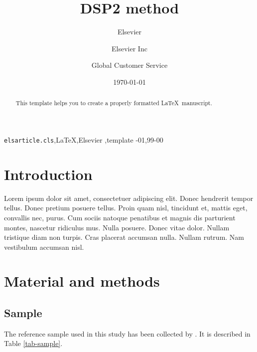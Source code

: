 \documentclass{elsarticle}
\date{\today}
\title{}
\begin{document}
\begin{frontmatter}

\title{DSP2 method}

\author{Elsevier}
\address{Radarweg 29, Amsterdam}

\author[mymainaddress,mysecondaryaddress]{Elsevier Inc}

\author[mysecondaryaddress]{Global Customer Service}

\address[mymainaddress]{1600 John F Kennedy Boulevard, Philadelphia}
\address[mysecondaryaddress]{360 Park Avenue South, New York}

\begin{abstract}
This template helps you to create a properly formatted \LaTeX\ manuscript.
\end{abstract}

\begin{keyword}
\texttt{elsarticle.cls}\sep \LaTeX\sep Elsevier \sep template
-01\sep  99-00
\end{keyword}

\end{frontmatter}

\linenumbers
\section{Introduction}
\label{sec:org7934d55}
Lorem ipsum dolor sit amet, consectetuer adipiscing elit.  Donec hendrerit tempor tellus.  Donec pretium posuere tellus.  Proin quam nisl, tincidunt et, mattis eget, convallis nec, purus.  Cum sociis natoque penatibus et magnis dis parturient montes, nascetur ridiculus mus.  Nulla posuere.  Donec vitae dolor.  Nullam tristique diam non turpis.  Cras placerat accumsan nulla.  Nullam rutrum.  Nam vestibulum accumsan nisl.

\section{Material and methods}
\label{sec:orgc81ddec}
\subsection{Sample}
\label{sec:org1d96131}
The reference sample used in this study has been collected by \cite{bruzek2002_MethodVisualDetermination}. It is described in Table \ref{tab-sample}.
\end{document}
